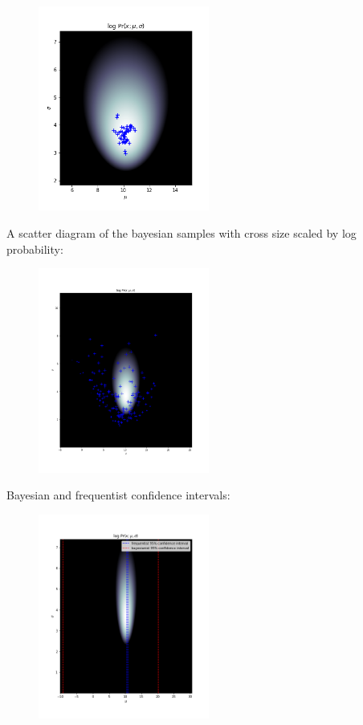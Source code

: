 \documentclass[10pt,\jkfside,a4paper]{article}
\begin{document}
\begin{enumerate}
\begin{enumerate}
\begin{figure}[H]
\centering
\includegraphics[width=0.5\textwidth]{./q13_b_frequentist_100}
\end{figure}

A scatter diagram of the bayesian samples with cross size scaled by log
probability:

\begin{figure}[H]
\centering
\includegraphics[width=0.5\textwidth]{./q13_c_bayesian_100}
\end{figure}

Bayesian and frequentist confidence intervals:

\begin{figure}[H]
\centering
\includegraphics[width=0.5\textwidth]{./q_13_d_frequentist_bayesian_100}
\end{figure}


\end{enumerate}
\end{enumerate}
\end{document}
